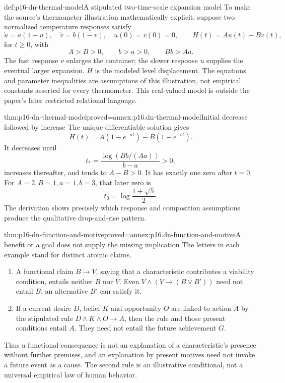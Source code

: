 \begin{hbdefinition}{def:p16-dn-thermal-model}{A stipulated two-time-scale expansion model}
To make the source's thermometer illustration
mathematically explicit, suppose two normalized
temperature responses satisfy
\[
 \dot u=a(1-u),\quad \dot v=b(1-v),\quad
 u(0)=v(0)=0,\qquad H(t)=Au(t)-Bv(t),
\]
for \(t\ge0\), with
\[
                     A>B>0,\qquad b>a>0,\qquad Bb>Aa .
\]
The fast response \(v\) enlarges the container;
the slower response \(u\) supplies the eventual
larger expansion. \(H\) is the modeled level
displacement. The equations and parameter
inequalities are assumptions of this
illustration, not empirical constants
asserted for every thermometer.
This real-valued model is outside the
paper's later restricted relational language.
\end{hbdefinition}

\begin{hbtheorem}{thm:p16-dn-thermal-model}{proved=annex:p16.dn-thermal-model}{Initial decrease followed by increase}
The unique differentiable solution gives
\[
 H(t)=A(1-e^{-at})-B(1-e^{-bt}).
\]
It decreases until
\[
                  t_*=\frac{\log(Bb/(Aa))}{b-a}>0,
\]
increases thereafter, and tends to \(A-B>0\).
It has exactly one zero after \(t=0\).
For \(A=2,B=1,a=1,b=3\), that later zero is
\[
                  t_0=\log\frac{1+\sqrt5}{2}.
\]
The derivation shows precisely which response
and composition assumptions produce the
qualitative drop-and-rise pattern.
\end{hbtheorem}

\begin{hbtheorem}{thm:p16-dn-function-and-motive}{proved=annex:p16.dn-function-and-motive}{A benefit or a goal does not supply the missing implication}
The letters in each example stand for distinct atomic claims.
\begin{enumerate}
\item A functional claim \(B\to V\), saying
      that a characteristic contributes a
      viability condition, entails neither
      \(B\) nor \(V\). Even
      \(V\land(V\to(B\lor B'))\) need not
      entail \(B\); an alternative \(B'\)
      can satisfy it.
\item If a current desire \(D\), belief \(K\)
      and opportunity \(O\) are linked to
      action \(A\) by the stipulated rule
      \(D\land K\land O\to A\), then the
      rule and those present conditions
      entail \(A\). They need not entail
      the future achievement \(G\).
\end{enumerate}
Thus a functional consequence is not an
explanation of a characteristic's presence
without further premises, and an explanation
by present motives need not invoke a future
event as a cause. The second rule is an
illustrative conditional, not a universal
empirical law of human behavior.
\end{hbtheorem}

